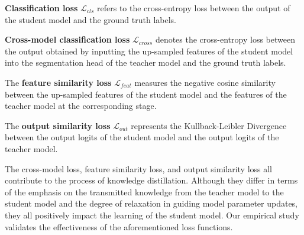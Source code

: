 {\bf Classification loss} $\mathcal{L}_{cls}$ refers to the cross-entropy loss between the output of the student model and the ground truth labels. 

{\bf Cross-model classification loss} $\mathcal{L}_{cross}$ denotes the cross-entropy loss between the output obtained by inputting the up-sampled features of the student model into the segmentation head of the teacher model and the ground truth labels. 

The {\bf feature similarity loss} $\mathcal{L}_{feat}$ measures the negative cosine similarity between the up-sampled features of the student model and the features of the teacher model at the corresponding stage. 

The {\bf output similarity loss} $\mathcal{L}_{out}$ represents the Kullback-Leibler Divergence between the output logits of the student model and the output logits of the teacher model.

The cross-model loss, feature similarity loss, and output similarity loss all contribute to the process of knowledge distillation. Although they differ in terms of the emphasis on the transmitted knowledge from the teacher model to the student model and the degree of relaxation in guiding model parameter updates, they all positively impact the learning of the student model. Our empirical study validates the effectiveness of the aforementioned loss functions.
